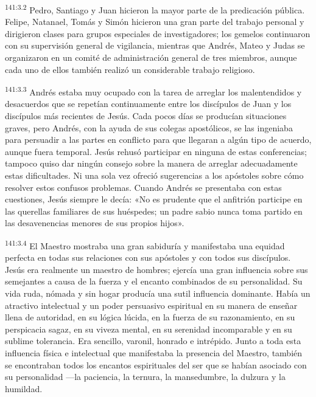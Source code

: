 \par 
\textsuperscript{141:3.2} Pedro, Santiago y Juan hicieron la mayor parte de la predicación pública. Felipe, Natanael, Tomás y Simón hicieron una gran parte del trabajo personal y dirigieron clases para grupos especiales de investigadores; los gemelos continuaron con su supervisión general de vigilancia, mientras que Andrés, Mateo y Judas se organizaron en un comité de administración general de tres miembros, aunque cada uno de ellos también realizó un considerable trabajo religioso.

\par 
\textsuperscript{141:3.3} Andrés estaba muy ocupado con la tarea de arreglar los malentendidos y desacuerdos que se repetían continuamente entre los discípulos de Juan y los discípulos más recientes de Jesús. Cada pocos días se producían situaciones graves, pero Andrés, con la ayuda de sus colegas apostólicos, se las ingeniaba para persuadir a las partes en conflicto para que llegaran a algún tipo de acuerdo, aunque fuera temporal. Jesús rehusó participar en ninguna de estas conferencias; tampoco quiso dar ningún consejo sobre la manera de arreglar adecuadamente estas dificultades. Ni una sola vez ofreció sugerencias a los apóstoles sobre cómo resolver estos confusos problemas. Cuando Andrés se presentaba con estas cuestiones, Jesús siempre le decía: «No es prudente que el anfitrión participe en las querellas familiares de sus huéspedes; un padre sabio nunca toma partido en las desavenencias menores de sus propios hijos».

\par 
\textsuperscript{141:3.4} El Maestro mostraba una gran sabiduría y manifestaba una equidad perfecta en todas sus relaciones con sus apóstoles y con todos sus discípulos. Jesús era realmente un maestro de hombres; ejercía una gran influencia sobre sus semejantes a causa de la fuerza y el encanto combinados de su personalidad. Su vida ruda, nómada y sin hogar producía una sutil influencia dominante. Había un atractivo intelectual y un poder persuasivo espiritual en su manera de enseñar llena de autoridad, en su lógica lúcida, en la fuerza de su razonamiento, en su perspicacia sagaz, en su viveza mental, en su serenidad incomparable y en su sublime tolerancia. Era sencillo, varonil, honrado e intrépido. Junto a toda esta influencia física e intelectual que manifestaba la presencia del Maestro, también se encontraban todos los encantos espirituales del ser que se habían asociado con su personalidad ---la paciencia, la ternura, la mansedumbre, la dulzura y la humildad.

